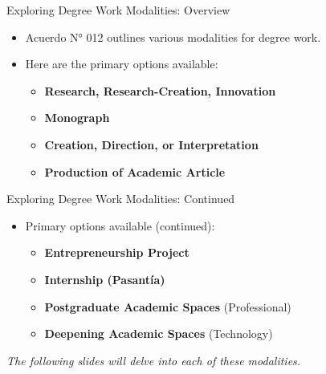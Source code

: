     \begin{frame}{Exploring Degree Work Modalities: Overview}
      \begin{itemize}
        \item<1-> Acuerdo N° 012 outlines various modalities for degree work.
        \item<2-> Here are the primary options available:
          \begin{itemize}
            \item<3-> \textbf{Research, Research-Creation, Innovation}
            \item<4-> \textbf{Monograph}
            \item<5-> \textbf{Creation, Direction, or Interpretation}
            \item<6-> \textbf{Production of Academic Article}
          \end{itemize}
      \end{itemize}
    \end{frame}

    \begin{frame}{Exploring Degree Work Modalities: Continued}
      \begin{itemize}
        \item[] Primary options available (continued):
          \begin{itemize}
            \item<1-> \textbf{Entrepreneurship Project}
            \item<2-> \textbf{Internship (Pasantía)}
            \item<3-> \textbf{Postgraduate Academic Spaces} (Professional)
            \item<4-> \textbf{Deepening Academic Spaces} (Technology)
          \end{itemize}
      \end{itemize}
      \begin{flushleft}
        \footnotesize{ \textit{The following slides will delve into each of these modalities.}}
      \end{flushleft}
    \end{frame}


